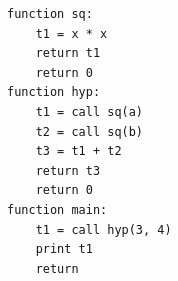 \begin{lstlisting}[]
function sq:
    t1 = x * x
    return t1
    return 0
function hyp:
    t1 = call sq(a)
    t2 = call sq(b)
    t3 = t1 + t2
    return t3
    return 0
function main:
    t1 = call hyp(3, 4)
    print t1
    return
\end{lstlisting}
